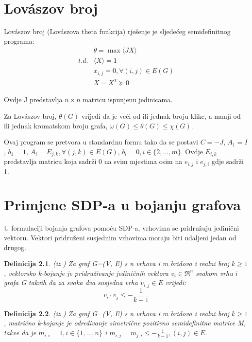 \documentclass[diplomskirad]{fer}
\newtheorem{definicija}{Definicija}
\begin{document}
\chapter{Lovászov broj}
\label{pog:lovaszov_broj}
Lovászov broj (Lovászova theta funkcija) rješenje je sljedećeg semidefinitnog programa:
\begin{equation}
  \begin{split}
    & \theta = \max \langle JX \rangle \\
    t.d. & \langle X \rangle = 1 \\
         & x_{i,j} = 0, \forall (i,j) \in E(G) \\
         & X=X^T \succeq 0 
  \end{split}
\end{equation}

Ovdje J predstavlja $n \times n$ matricu ispunjenu jedinicama.


Za Lovászov broj, $ \theta(G) $ vrijedi da je veći od ili jednak broju klike, a manji od ili jednak kromatskom broju grafa, 
$\omega(G) \leq \theta(G) \leq \chi(G)$. \cite{1055985}

Ovaj program se pretvora u standardnu formu tako da se postavi $C = -J$, $A_1 = I$, $b_1 = 1$,
$A_i = E_{j,k}, \forall (j,k) \in E(G)$, $b_i = 0, i \in \{2, \dots, m\}$. Ovdje $E_{i,k}$ predstavlja matricu koja sadrži 0 na
svim mjestima osim na $e_{i,j}$ i $e_{j, i}$ gdje sadrži 1.


\chapter{Primjene SDP-a u bojanju grafova}
\label{pog:primjene_SDP-a_u_bojanju_grafova}

U formulaciji bojanja grafova pomoću SDP-a, vrhovima se pridružuju jedinični vektoru. Vektori pridruženi susjednim vrhovima moraju
biti udaljeni jedan od drugog.

\begin{definicija} (iz \cite{karger1998approximategraphcoloringsemidefinite})
  Za graf G=(V, E) s n vrhova i m bridova i realni broj $k \geq 1$, vektorsko k-bojanje je pridruživanje jediničnih
  vektora $v_i \in \Re^n$ svakom vrhu $i$ grafa G takvih da za svaka dva susjedna vrha $v_{i,j} \in E$ vrijedi:
  \begin{equation}
    v_i \cdot v_j \leq - \frac{1}{k-1}
  \end{equation}
\end{definicija}

\begin{definicija} (iz \cite{karger1998approximategraphcoloringsemidefinite})
  Za graf G=(V, E) s n vrhova i m bridova i realni broj $k \geq 1$, matrično k-bojanje je određivanje simetrične pozitivno semidefinitne matrice M,
  takve da je $m_{i,i} = 1, i \in \{1, \dots, n\}$ i $m_{i,j} = m_{j,i} \leq - \frac{1}{k-1}, (i, j) \in E$.
\end{definicija}
\end{document}
